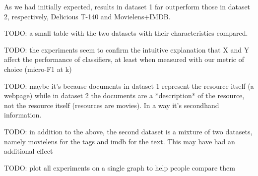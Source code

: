 As we had initially expected, results in dataset 1 far outperform those in dataset 2, respectively, Delicious T-140 and Movielens+IMDB.

{\color{red} TODO: a small table with the two datasets with their characteristics compared.}

{\color{red} TODO: the experiments seem to confirm the intuitive explanation that X and Y affect the performance of classifiers, at least when measured with our metric of choice (micro-F1 at k)}

{\color{red} TODO: maybe it's because documents  in dataset 1 represent the resource itself (a webpage) while in dataset 2 the documents are a *description* of the resource, not the resource itself (resources are movies). In a way it's secondhand information.}

{\color{red} TODO: in addition to the above, the second dataset is a mixture of two datasets, namely movielens for the tags and imdb for the text. This may have had an additional effect }

{\color{red} TODO: plot all experiments on a single graph to help people compare them}
